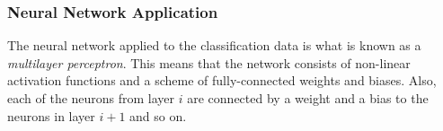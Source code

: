        \subsubsection{Neural Network Application}
            The neural network applied to the classification data is what is known as a \textit{multilayer perceptron}. This means that the network consists of non-linear activation functions and a scheme of fully-connected weights and biases. Also, each of the neurons from layer $i$ are connected by a weight and a bias to the neurons in layer $i+1$ and so on.
      
      
